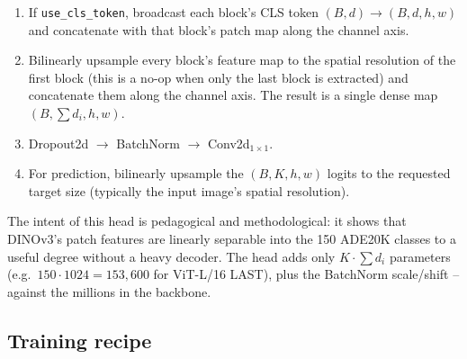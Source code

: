 \documentclass[11pt,a4paper]{article}
\begin{document}
\begin{enumerate}[leftmargin=1.6em,itemsep=0pt]
  \item If \texttt{use\_cls\_token}, broadcast each block's CLS token
        $(B,d)\to(B,d,h,w)$ and concatenate with that block's patch map
        along the channel axis.
  \item Bilinearly upsample every block's feature map to the spatial
        resolution of the first block (this is a no-op when only the last
        block is extracted) and concatenate them along the channel axis.
        The result is a single dense map $(B, \sum d_i, h, w)$.
  \item Dropout2d $\to$ BatchNorm $\to$ Conv2d$_{1\times1}$.
  \item For prediction, bilinearly upsample the $(B, K, h, w)$ logits to
        the requested target size (typically the input image's spatial
        resolution).
\end{enumerate}

The intent of this head is pedagogical and methodological: it shows that
DINOv3's patch features are linearly separable into the 150 ADE20K classes
to a useful degree without a heavy decoder. The head adds only $K \cdot
\sum d_i$ parameters (e.g.\ $150 \cdot 1024 = 153{,}600$ for ViT-L/16 LAST),
plus the BatchNorm scale/shift -- against the millions in the backbone.

\subsection{Training recipe}
\end{document}
